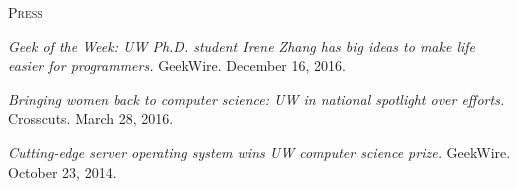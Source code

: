 \documentclass[10pt,minionpro]{report}
\newlength{\sectiongap}
\newlength{\sectioncolwidth}
\newlength{\colgap}
\newlength{\stuffwidth}
\newenvironment{rtable}{
  \begin{minipage}{\textwidth}
  }{
  \end{minipage}
}
\newenvironment{rsection}[1]{
  \begin{minipage}[t]{\sectioncolwidth}
    \textsc{#1}
  \end{minipage}
  \hspace{\colgap}
  \begin{minipage}[t]{\stuffwidth}
  }{
    \removelastskip
  \end{minipage}
  \\[\sectiongap]
}
\begin{document}
\begin{rtable}
  \begin{rsection}{Press}
    \textit{Geek of the Week: UW Ph.D. student Irene Zhang has big
      ideas to make life easier for programmers.} GeekWire. December
    16, 2016.\\\vspace{-0.5em}
    
    \textit{Bringing
      women back to computer science: UW in national spotlight over
      efforts.} Crosscuts. March 28, 2016.\\\vspace{-0.5em}

    \textit{Cutting-edge server operating system wins UW computer
      science prize.} GeekWire. October 23, 2014.\\\vspace{-0.5em}


\end{rsection}
\end{rtable}
\end{document}
